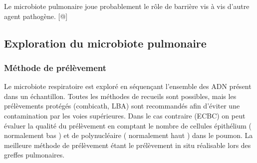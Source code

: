 \documentclass[12pt,a4paper]{article}
\begin{document}
Le microbiote pulmonaire joue probablement le rôle de barrière vis à vis d'autre agent pathogène.  [@]

\subsection{Exploration du microbiote pulmonaire}

\subsubsection{Méthode de prélèvement}
Le microbiote respiratoire est exploré en séquençant l'ensemble des ADN présent dans un échantillon. 
Toutes les méthodes de recueils sont possibles, mais les prélèvements protégés (combicath, LBA) sont recommandés afin
d’éviter une contamination par les voies supérieures. Dans le cas contraire (ECBC) on peut évaluer la qualité du prélèvement en comptant le nombre de cellules épithélium ( normalement bas ) et de polynucléaire ( normalement haut ) dans le poumon. La meilleure méthode de prélèvement étant le prélèvement in situ réalisable lors des greffes pulmonaires.
\end{document}
